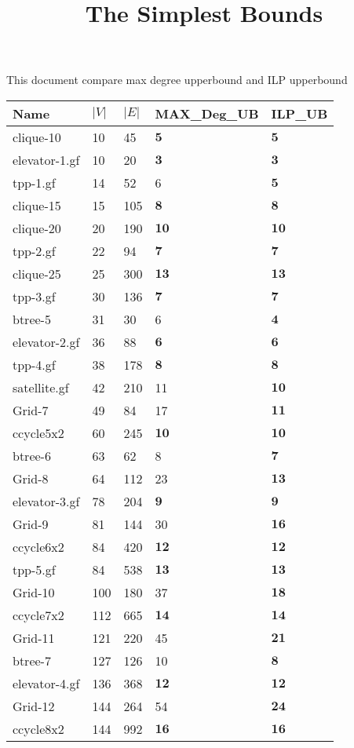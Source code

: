\documentclass{article}
\title{The Simplest Bounds}
\begin{document}
\maketitle
This document compare max degree upperbound and ILP upperbound
\begin{longtable}{|l |l |l |l |l |}
\hline
Name&$|V|$&$|E|$&MAX\_Deg\_UB&ILP\_UB\\
\hline
clique-10&10&45&$\mathbf{5}$&$\mathbf{5}$\\
elevator-1.gf&10&20&$\mathbf{3}$&$\mathbf{3}$\\
tpp-1.gf&14&52&6&$\mathbf{5}$\\
clique-15&15&105&$\mathbf{8}$&$\mathbf{8}$\\
clique-20&20&190&$\mathbf{10}$&$\mathbf{10}$\\
tpp-2.gf&22&94&$\mathbf{7}$&$\mathbf{7}$\\
clique-25&25&300&$\mathbf{13}$&$\mathbf{13}$\\
tpp-3.gf&30&136&$\mathbf{7}$&$\mathbf{7}$\\
btree-5&31&30&6&$\mathbf{4}$\\
elevator-2.gf&36&88&$\mathbf{6}$&$\mathbf{6}$\\
tpp-4.gf&38&178&$\mathbf{8}$&$\mathbf{8}$\\
satellite.gf&42&210&11&$\mathbf{10}$\\
Grid-7&49&84&17&$\mathbf{11}$\\
ccycle5x2&60&245&$\mathbf{10}$&$\mathbf{10}$\\
btree-6&63&62&8&$\mathbf{7}$\\
Grid-8&64&112&23&$\mathbf{13}$\\
elevator-3.gf&78&204&$\mathbf{9}$&$\mathbf{9}$\\
Grid-9&81&144&30&$\mathbf{16}$\\
ccycle6x2&84&420&$\mathbf{12}$&$\mathbf{12}$\\
tpp-5.gf&84&538&$\mathbf{13}$&$\mathbf{13}$\\
Grid-10&100&180&37&$\mathbf{18}$\\
ccycle7x2&112&665&$\mathbf{14}$&$\mathbf{14}$\\
Grid-11&121&220&45&$\mathbf{21}$\\
btree-7&127&126&10&$\mathbf{8}$\\
elevator-4.gf&136&368&$\mathbf{12}$&$\mathbf{12}$\\
Grid-12&144&264&54&$\mathbf{24}$\\
ccycle8x2&144&992&$\mathbf{16}$&$\mathbf{16}$\\

\end{longtable}
\end{document}
